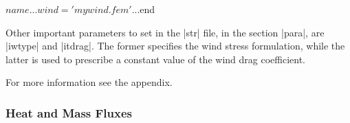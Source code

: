 \begin{code}
$name
...
wind = 'mywind.fem'
...
$end
\end{code}

Other important parameters to set in the |str| file, in the section
|para|, are |iwtype| and |itdrag|. The former specifies the wind stress
formulation, while the latter is used to prescribe a constant value of
the wind drag coefficient.

For more information see the appendix.


\subsubsection{Heat and Mass Fluxes}
 








